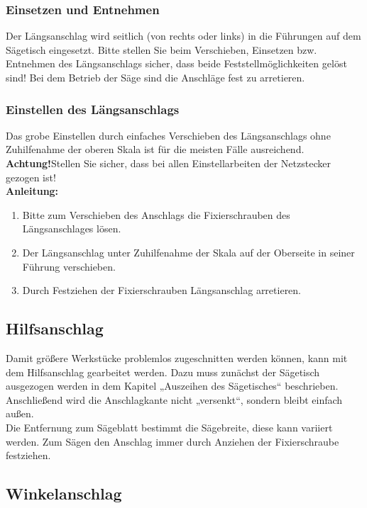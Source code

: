 \documentclass{\basedir/fablab-document}
\begin{document}
\subsubsection{Einsetzen und Entnehmen}
Der Längsanschlag wird seitlich (von rechts oder links) in die Führungen auf dem Sägetisch eingesetzt. Bitte stellen Sie beim Verschieben, Einsetzen bzw. Entnehmen des Längsanschlags sicher, dass beide Feststellmöglichkeiten gelöst sind! Bei dem Betrieb der Säge sind die Anschläge fest zu arretieren. 

\subsubsection{Einstellen des Längsanschlags}

Das grobe Einstellen durch einfaches Verschieben des Längsanschlags ohne Zuhilfenahme der oberen Skala ist für die meisten Fälle ausreichend.\\
\textbf{Achtung!}Stellen Sie sicher, dass bei allen Einstellarbeiten der Netzstecker gezogen ist! \\

\textbf{Anleitung:} \\
\renewcommand{\labelenumi}{\alph{enumi})}
\begin{enumerate}
	\item Bitte zum Verschieben des Anschlags die Fixierschrauben des Längsanschlages lösen.
	\item Der Längsanschlag unter Zuhilfenahme der Skala auf der Oberseite in seiner Führung verschieben. 
	\item Durch Festziehen der Fixierschrauben Längsanschlag arretieren.
	
\end{enumerate}

\subsection{Hilfsanschlag}
Damit größere Werkstücke problemlos zugeschnitten werden können, kann mit dem Hilfsanschlag gearbeitet werden. Dazu muss zunächst der Sägetisch ausgezogen werden in dem Kapitel „Auszeihen des Sägetisches“ beschrieben. Anschließend wird die Anschlagkante nicht „versenkt“, sondern bleibt einfach außen. \\
Die Entfernung zum Sägeblatt bestimmt die Sägebreite, diese kann variiert werden. Zum Sägen den Anschlag immer durch Anziehen der Fixierschraube festziehen.
\subsection{Winkelanschlag}
\end{document}
